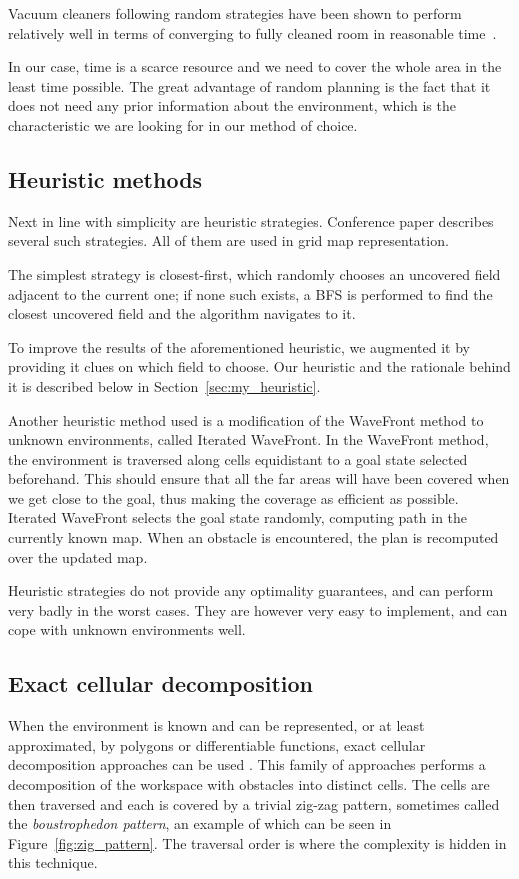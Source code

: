 \documentclass[buriama8_dp.tex]{subfiles}
\begin{document}
Vacuum cleaners following random strategies have been shown to perform relatively well in terms of converging to fully cleaned room in reasonable time~\cite{randomcover}.

In our case, time is a scarce resource and we need to cover the whole area in the least time possible. The great advantage of random planning is the fact that it does not need any prior information about the environment, which is the characteristic we are looking for in our method of choice.

\subsection{Heuristic methods}
\label{subsec:heuritic}
Next in line with simplicity are heuristic strategies. Conference paper \cite{rt_heuristic_coverage} describes several such strategies. All of them are used in grid map representation.

The simplest strategy is closest-first, which randomly chooses an uncovered field adjacent to the current one; if none such exists, a BFS is performed to find the closest uncovered field and the algorithm navigates to it.

To improve the results of the aforementioned heuristic, we augmented it by providing it clues on which field to choose. Our heuristic and the rationale behind it is described below in Section~\ref{sec:my_heuristic}.

Another heuristic method used is a modification of the WaveFront method \cite{wavefront} to unknown environments, called Iterated WaveFront. In the WaveFront method, the environment is traversed along cells equidistant to a goal state selected beforehand. This should ensure that all the far areas will have been covered when we get close to the goal, thus making the coverage as efficient as possible. Iterated WaveFront selects the goal state randomly, computing path in the currently known map. When an obstacle is encountered, the plan is recomputed over the updated map.

Heuristic strategies do not provide any optimality guarantees, and can perform very badly in the worst cases. They are however very easy to implement, and can cope with unknown environments well. 

\subsection{Exact cellular decomposition}
\label{subsec:boustrop}
When the environment is known and can be represented, or at least approximated, by polygons or differentiable functions, exact cellular decomposition approaches can be used \cite{survey13}. This family of approaches performs a decomposition of the workspace with obstacles into distinct cells. The cells are then traversed and each is covered by a trivial zig-zag pattern, sometimes called the \textit{boustrophedon pattern}, an example of which can be seen in Figure~\ref{fig:zig_pattern}. The traversal order is where the complexity is hidden in this technique.
\end{document}
